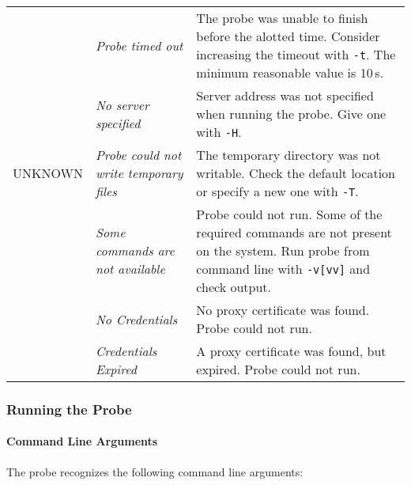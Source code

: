 \begin{tabularx}{\textwidth}{|c|p{5cm}|X|}
\hline
\multirow{5}{*}{UNKNOWN} & \emph{Probe timed out} & The probe was unable to finish before the alotted time. Consider increasing the timeout with \texttt{-t}. The minimum reasonable value is 10\,s. \\
& \emph{No server specified} & Server address was not specified when running the probe. Give one with \texttt{-H}. \\
& \emph{Probe could not write temporary files} & The temporary directory was not writable. Check the default location or specify a new one with \texttt{-T}.\\
& \emph{Some commands are not available} & Probe could not run. Some of the required commands are not present on the system. Run probe from command line with \texttt{-v[vv]} and check output. \\
& \emph{No Credentials} & No proxy certificate was found. Probe could not run. \\
& \emph{Credentials Expired} & A proxy certificate was found, but expired. Probe could not run. \\
\hline
\end{tabularx}

\subsubsection{Running the Probe}

\paragraph{Command Line Arguments}
The probe recognizes the following command line arguments:

